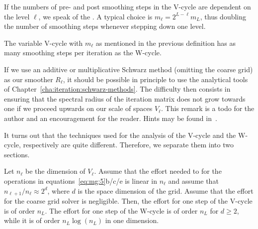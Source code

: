 \begin{definition}
  If the numbers of pre- and post smoothing steps in the V-cycle are
  dependent on the level $\ell$, we speak of the . A typical choice is $m_\ell = 2^{L-\ell} m_L$, thus
  doubling the number of smoothing steps whenever stepping down one
  level.
\end{definition}

\begin{note}
  The variable V-cycle with $m_\ell$ as mentioned in the previous
  definition has as many smoothing steps per iteration as the W-cycle.
\end{note}

\begin{remark}
  If we use an additive or multiplicative Schwarz method (omitting the
  coarse grid) as our smoother $R_\ell$, it should be possible in
  principle to use the analytical tools of
  Chapter~\ref{cha:iteration:schwarz-methods}. The difficulty then
  consists in ensuring that the spectral radius of the iteration
  matrix does not grow towards one if we proceed upwards on our scale
  of spaces $V_\ell$. This remark is a todo for the author and an
  encouragement for the reader. Hints may be found
  in~\cite{GriebelOswald95,Xu92}.
\end{remark}

\begin{remark}
  It turns out that the techniques used for the analysis of the
  V-cycle and the W-cycle, respectively are quite
  different. Therefore, we separate them into two sections.
\end{remark}

\begin{theorem}
  Let $n_\ell$ be the dimension of $V_\ell$. Assume that the effort
  needed to for the operations in equations~\eqref{eq:mg:5}b/c/e is
  linear in $n_\ell$ and assume that $ n_{\ell+1}/n_\ell \approx 2^d$,
  where $d$ is the space dimension of the grid. Assume that the effort
  for the coarse grid solver is negligible. Then, the effort for
  one step of the V-cycle is of order $n_L$. The effort for one step
  of the W-cycle is of order $n_L$ for $d \ge 2$, while it is of order
  $n_L \log(n_L)$ in one dimension.
\end{theorem}

